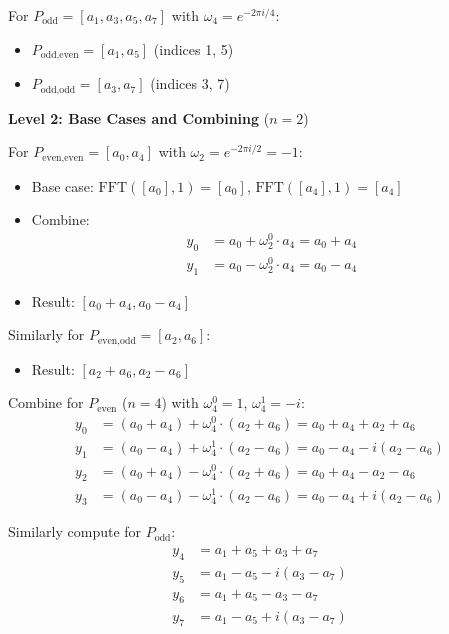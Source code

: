 \documentclass[a4paper]{article}
\theoremstyle{definition}
\begin{document}
For \( P_{\text{odd}} = [a_1, a_3, a_5, a_7] \) with \(\omega_4 = e^{-2\pi i / 4}\):
\begin{itemize}
    \item \( P_{\text{odd,even}} = [a_1, a_5] \) (indices 1, 5)
    \item \( P_{\text{odd,odd}} = [a_3, a_7] \) (indices 3, 7)
\end{itemize}

\textbf{Level 2: Base Cases and Combining} (\( n=2 \))

For \( P_{\text{even,even}} = [a_0, a_4] \) with \(\omega_2 = e^{-2\pi i / 2} = -1\):
\begin{itemize}
    \item Base case: \(\text{FFT}([a_0], 1) = [a_0]\), \(\text{FFT}([a_4], 1) = [a_4]\)
    \item Combine:
    \begin{align*}
    y_0 &= a_0 + \omega_2^0 \cdot a_4 = a_0 + a_4 \\
    y_1 &= a_0 - \omega_2^0 \cdot a_4 = a_0 - a_4
    \end{align*}
    \item Result: \([a_0 + a_4, a_0 - a_4]\)
\end{itemize}

Similarly for \( P_{\text{even,odd}} = [a_2, a_6] \):
\begin{itemize}
    \item Result: \([a_2 + a_6, a_2 - a_6]\)
\end{itemize}

Combine for \( P_{\text{even}} \) (\( n=4 \)) with \(\omega_4^0 = 1\), \(\omega_4^1 = -i\):
\begin{align*}
y_0 &= (a_0 + a_4) + \omega_4^0 \cdot (a_2 + a_6) = a_0 + a_4 + a_2 + a_6 \\
y_1 &= (a_0 - a_4) + \omega_4^1 \cdot (a_2 - a_6) = a_0 - a_4 - i(a_2 - a_6) \\
y_2 &= (a_0 + a_4) - \omega_4^0 \cdot (a_2 + a_6) = a_0 + a_4 - a_2 - a_6 \\
y_3 &= (a_0 - a_4) - \omega_4^1 \cdot (a_2 - a_6) = a_0 - a_4 + i(a_2 - a_6)
\end{align*}

Similarly compute for \( P_{\text{odd}} \):
\begin{align*}
y_4 &= a_1 + a_5 + a_3 + a_7 \\
y_5 &= a_1 - a_5 - i(a_3 - a_7) \\
y_6 &= a_1 + a_5 - a_3 - a_7 \\
y_7 &= a_1 - a_5 + i(a_3 - a_7)
\end{align*}
\end{document}
